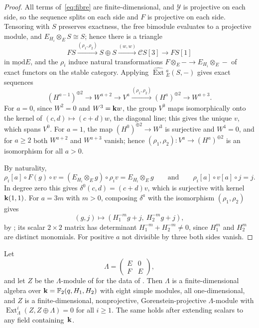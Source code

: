 \begin{proof}
  All terms of~\eqref{eq:fibre} are finite-dimensional, and $\mathcal{Y}$ is
  projective on each side, so the sequence splits on each side and $F$ is
  projective on each side. Tensoring with $S$ preserves exactness, the free
  bimodule evaluates to a projective module, and ${E_{H_i}\otimes_ES\cong S}$;
  hence there is a triangle
  \[
    FS\xrightarrow{(\rho_1,\rho_2)}S\oplus S\xrightarrow{(w,w)}
    \mathcal{C}S[3]\longrightarrow FS[1]
  \]
  in $\operatorname{\underline{mod}}E$, and the $\rho_i$ induce natural
  transformations ${F\otimes_E-\to E_{H_i}\otimes_E-}$ of exact functors on the
  stable category. Applying ${\widehat{\operatorname{Ext}}{}^a_E(S,-)}$ gives
  exact sequences
  \[
    (H^{a-1})^{\oplus2}\longrightarrow W^{a+2}\longrightarrow V^a
    \xrightarrow{(\rho_1,\rho_2)}(H^a)^{\oplus2}\longrightarrow W^{a+3}.
  \]
  For ${a=0}$, since ${W^2=0}$ and ${W^3=\mathbf{k} w}$, the group $V^0$ maps
  isomorphically onto the kernel of ${(c,d)\mapsto(c+d)w}$, the diagonal line;
  this gives the unique $v$, which spans $V^0$. For ${a=1}$, the map
  ${(H^0)^{\oplus2}\to W^3}$ is surjective and ${W^4=0}$, and for ${a\geq2}$ both
  $W^{a+2}$ and $W^{a+3}$ vanish; hence ${(\rho_1,\rho_2)\colon V^a\to
  (H^a)^{\oplus2}}$ is an isomorphism for all ${a>0}$.

  By naturality,
  \[
    \rho_i[a]\circ F(g)\circ v=(E_{H_i}\otimes_E g)\circ\rho_iv=
    E_{H_i}\otimes_Eg\qquad\text{and}\qquad\rho_i[a]\circ v[a]\circ j=j.
  \]
  In degree zero this
  gives ${\delta^0(c,d)=(c+d)v}$, which is surjective with kernel $\mathbf{k}(1,1)$. For
  ${a=3m}$ with ${m>0}$, composing $\delta^a$ with the isomorphism $(\rho_1,\rho_2)$
  gives
  \[
    (g,j)\longmapsto(H_1^{-m}g+j,\ H_2^{-m}g+j),
  \]
  by ; its scalar ${2\times2}$ matrix has determinant
  ${H_1^{-m}+H_2^{-m}\neq0}$, since
  $H_1^m$ and $H_2^m$ are distinct monomials. For positive $a$ not divisible
  by three both sides vanish.
\end{proof}

\begin{theorem}
  \label{thm:ar-counterexample}
  Let
  \[
    \Lambda=\begin{pmatrix}E&0\\F&E\end{pmatrix},
  \]
  and let $Z$ be the $\Lambda$-module of  for the data of
  . Then $\Lambda$ is a finite-dimensional algebra over
  ${\mathbf{k}=\mathbb{F}_2(q,H_1,H_2)}$ with eight simple modules, all one-dimensional,
  and $Z$ is a finite-dimensional, nonprojective, Gorenstein-projective
  $\Lambda$-module with ${\operatorname{Ext}^i_\Lambda(Z,Z\oplus\Lambda)=0}$ for
  all ${i\geq1}$. The same holds after extending scalars to any field
  containing~$\mathbf{k}$.
\end{theorem}

